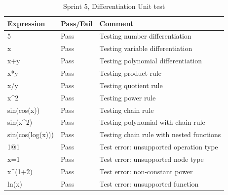 \documentclass[a4paper, oneside, 11pt]{report}
\begin{document}
\begin{table}[h]
\caption{Sprint 5, Differentiation Unit test}
\label{sprint5-differentiation-unit-test}
\begin{tabular}{|l|l|l|}
\hline
\textbf{Expression}       & \textbf{Pass/Fail} & \textbf{Comment}                         \\ \hline
5                         & Pass               & Testing number differentiation           \\ \hline
x                         & Pass               & Testing variable differentiation         \\ \hline
x+y                       & Pass               & Testing polynomial differentiation       \\ \hline
x*y                       & Pass               & Testing product rule                     \\ \hline
x/y                       & Pass               & Testing quotient rule                    \\ \hline
x\textasciicircum{}2      & Pass               & Testing power rule                       \\ \hline
sin(cos(x))               & Pass               & Testing chain rule                       \\ \hline
sin(x\textasciicircum{}2) & Pass               & Testing polynomial with chain rule       \\ \hline
sin(cos(log(x)))          & Pass               & Testing chain rule with nested functions \\ \hline
1@1                       & Pass               & Test error: unsupported operation type   \\ \hline
x=1                       & Pass               & Test error: unsupported node type        \\ \hline
x\textasciicircum{}(1+2)  & Pass               & Test error: non-constant power           \\ \hline
ln(x)                     & Pass               & Test error: unsupported function         \\ \hline
\end{tabular}
\end{table}
\end{document}
